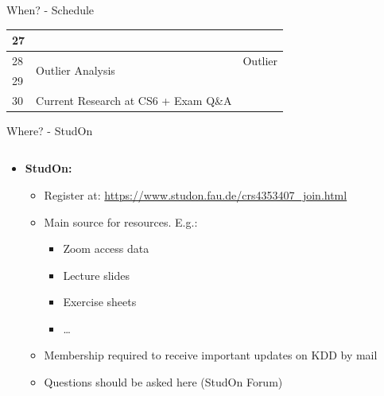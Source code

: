 \begin{frame}{When? - Schedule}
\begin{center}
{\begin{tabular}{|l|l|l|}
				27                     &                                                     &                                                                 \\ \hline
				28                     & \multirow{2}{*}{Outlier Analysis}                   & Outlier                                                         \\ \cline{1-1} \cline{3-3}
				29                     &                                                     &                                                                 \\ \hline
				30                     & Current Research at CS6 + Exam Q\&A                 &                                                                 \\ \hline
			\end{tabular}}
	\end{center}
\end{frame}

\begin{frame}{Where? - StudOn}
	\begin{columns}
		\begin{column}{0.7\textwidth}
			\begin{itemize}
				\item \textbf{StudOn:}
				      \begin{itemize}
					      \item Register at: \url{https://www.studon.fau.de/crs4353407_join.html}
					      \item Main source for resources. E.g.:
					            \begin{itemize}
						            \item Zoom access data
						            \item Lecture slides
						            \item Exercise sheets
						            \item \ldots
					            \end{itemize}
					      \item Membership required to receive important updates on KDD by mail
					      \item Questions should be asked here (StudOn Forum)

				      \end{itemize}
			\end{itemize}
		\end{column}
		\begin{column}{0.3\textwidth}
			\begin{center}
			\end{center}
		\end{column}
	\end{columns}

\end{frame}


